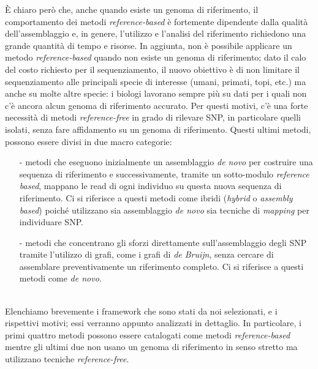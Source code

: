 \documentclass[../main.tex]{subfiles}
\begin{document}
È chiaro però che, anche quando esiste un genoma di riferimento, il comportamento dei metodi \textit{reference-based} è fortemente dipendente dalla qualità dell'assemblaggio e, in genere, l'utilizzo e l'analisi del riferimento richiedono una grande quantità di tempo e risorse. In aggiunta, non è possibile applicare un metodo \textit{reference-based} quando non esiste un genoma di riferimento; dato il calo del costo richiesto per il sequenziamento, il nuovo obiettivo è di non limitare il sequenziamento alle principali specie di interesse (umani, primati, topi, etc.) ma anche su molte altre specie: i biologi lavorano sempre più su dati per i quali non c'è ancora alcun genoma di riferimento accurato. Per questi motivi, c'è una forte necessità di metodi \textit{reference-free} in grado di rilevare SNP, in particolare quelli isolati, senza fare affidamento su un genoma di riferimento. Questi ultimi metodi, possono essere divisi in due macro categorie:
\begin{itemize} 
\item[-] metodi che eseguono inizialmente un assemblaggio \textit{de novo} per costruire una sequenza di riferimento e successivamente, tramite un sotto-modulo \textit{reference based}, mappano le read di ogni individuo su questa nuova sequenza di riferimento. Ci si riferisce a questi metodi come ibridi (\textit{hybrid} o \textit{assembly based}) poiché utilizzano sia assemblaggio \textit{de novo} sia tecniche di \textit{mapping} per individuare SNP.
\item[-] metodi che concentrano gli sforzi direttamente sull'assemblaggio degli SNP tramite l'utilizzo di grafi, come i grafi di \textit{de Bruijn}, senza cercare di assemblare preventivamente un riferimento completo. Ci si riferisce a questi metodi come \textit{de novo}.
\end{itemize}

\noindent
\\Elenchiamo brevemente i framework che sono stati da noi selezionati, e i rispettivi motivi; essi verranno appunto analizzati in dettaglio. In particolare, i primi quattro metodi possono essere catalogati come metodi \textit{reference-based} mentre gli ultimi due non usano un genoma di riferimento in senso stretto ma utilizzano tecniche \textit{reference-free}.
\end{document}
